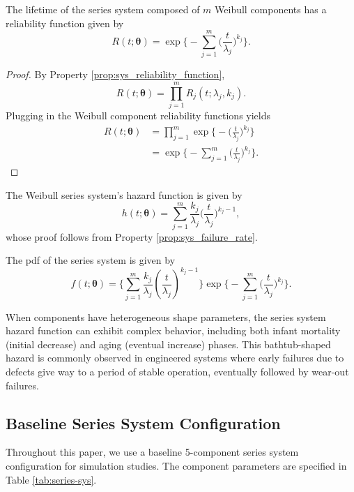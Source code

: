 \documentclass[11pt]{article}
\renewcommand{\v}[1]{\boldsymbol{#1}}
\begin{document}
The lifetime of the series system composed of $m$ Weibull components has a reliability function given by
\begin{equation}
\label{eq:sys_weibull_reliability_function}
R(t;\v\theta) = \exp\biggl\{-\sum_{j=1}^{m}\biggl(\frac{t}{\lambda_j}\biggr)^{k_j}\biggr\}.
\end{equation}
\begin{proof}
By Property \ref{prop:sys_reliability_function},
$$
R(t;\v\theta) = \prod_{j=1}^{m} R_j(t;\lambda_j,k_j).
$$
Plugging in the Weibull component reliability functions yields
\begin{align*}
R(t;\v\theta)
    &= \prod_{j=1}^{m} \exp\biggl\{-\biggl(\frac{t}{\lambda_j}\biggr)^{k_j}\biggr\}\\
    &= \exp\biggl\{-\sum_{j=1}^{m}\biggl(\frac{t}{\lambda_j}\biggr)^{k_j}\biggr\}.
\end{align*}
\end{proof}

The Weibull series system's hazard function is given by
\begin{equation}
\label{eq:sys_weibull_failure_rate_function}
h(t;\v\theta) =
    \sum_{j=1}^{m} \frac{k_j}{\lambda_j}\biggl(\frac{t}{\lambda_j}\biggr)^{k_j-1},
\end{equation}
whose proof follows from Property \ref{prop:sys_failure_rate}.

The pdf of the series system is given by
\begin{equation}
\label{eq:sys_weibull_pdf}
f(t;\v\theta) =
\biggl\{
    \sum_{j=1}^m \frac{k_j}{\lambda_j}\left(\frac{t}{\lambda_j}\right)^{k_j-1}
\biggr\}
\exp
\biggl\{
    -\sum_{j=1}^m \bigl(\frac{t}{\lambda_j}\bigr)^{k_j}
\biggr\}.
\end{equation}

When components have heterogeneous shape parameters, the series system hazard function can exhibit complex behavior, including both infant mortality (initial decrease) and aging (eventual increase) phases. This bathtub-shaped hazard is commonly observed in engineered systems where early failures due to defects give way to a period of stable operation, eventually followed by wear-out failures.

\subsection{Baseline Series System Configuration}

Throughout this paper, we use a baseline 5-component series system configuration for simulation studies. The component parameters are specified in Table \ref{tab:series-sys}.
\end{document}
